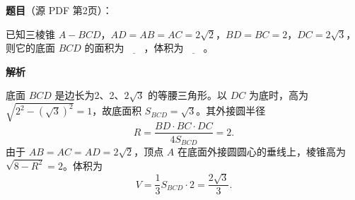 \begin{answer}

\textbf{题目}（源 PDF 第2页）：

已知三棱锥 \(A-BCD\)，\(AD=AB=AC=2\sqrt{2}\)，\(BD=BC=2\)，\(DC=2\sqrt{3}\)，则它的底面 \(BCD\) 的面积为\(\underline{\qquad}\)，体积为\(\underline{\qquad}\)。
\nopagebreak[4]
\begin{center}\end{center}
\nopagebreak[4]
\textbf{解析}

底面 \(BCD\) 是边长为2、2、\(2\sqrt3\) 的等腰三角形。以 \(DC\) 为底时，高为
\(\sqrt{2^2-(\sqrt3)^2}=1\)，故底面积 \(S_{BCD}=\sqrt3\)。其外接圆半径
\nopagebreak[4]
\[
R=\frac{BD\cdot BC\cdot DC}{4S_{BCD}}=2.
\]
由于 \(AB=AC=AD=2\sqrt2\)，顶点 \(A\) 在底面外接圆圆心的垂线上，棱锥高为 \(\sqrt{8-R^2}=2\)。体积为
\nopagebreak[4]
\[
V=\frac13S_{BCD}\cdot2=\frac{2\sqrt3}{3}.
\]


\end{answer}
